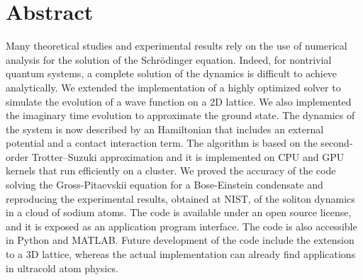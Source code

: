 \thispagestyle{empty}
\chapter*{Abstract}
Many theoretical studies and experimental results rely on the use of numerical analysis for the solution of the Schr\"odinger equation. Indeed, for nontrivial quantum systems, a complete solution of the dynamics is difficult to achieve analytically. We extended the implementation of a highly optimized solver to simulate the evolution of a wave function on a 2D lattice. We also implemented the imaginary time evolution to approximate the ground state. The dynamics of the system is now described by an Hamiltonian that includes an external potential and a contact interaction term. The algorithm is based on the second-order Trotter--Suzuki approximation and it is implemented on CPU and GPU kernels that run efficiently on a cluster. We proved the accuracy of the code solving the Gross-Pitaevskii equation for a Bose-Einstein condensate and reproducing the experimental results, obtained at NIST, of the soliton dynamics in a cloud of sodium atoms. The code is available under an open source license, and it is exposed as an application program interface. The code is also accessible in Python and MATLAB. Future development of the code include the extension to a 3D lattice, whereas the actual implementation can already find applications in ultracold atom physics.